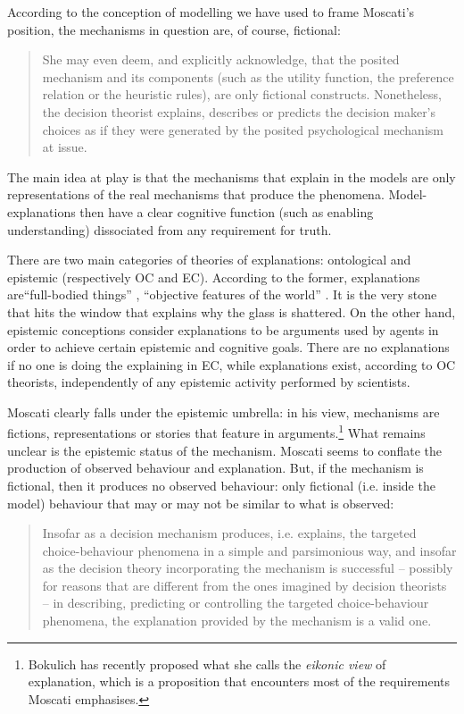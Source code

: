 \documentclass[a4paper,11pt]{article}
\theoremstyle{definition}
\begin{document}
According to the conception of modelling we have used to frame Moscati's position, the mechanisms in question are, of course, fictional:

\begin{quote}
     She may even deem, and explicitly acknowledge, that the posited mechanism and its components (such as the utility function, the preference relation or the heuristic rules), are only fictional constructs. Nonetheless, the decision theorist explains, describes or predicts the decision maker’s choices as if they were generated by the posited psychological mechanism at issue. \citep[p.~2]{Moscati2023}
\end{quote}

The main idea at play is that the mechanisms that explain in the models are only representations of the real mechanisms that produce the phenomena. Model-explanations then have a clear cognitive function (such as enabling understanding) dissociated from any requirement for truth.

There are two main categories of theories of explanations: ontological and epistemic (respectively OC and EC). According to the former, explanations are``full-bodied things'' \citep[p.~40]{Craver2014}, ``objective features of the world'' \citep[p.~27]{Craver2007}. It is the very stone that hits the window that explains why the glass is shattered. On the other hand, epistemic conceptions consider explanations to be arguments used by agents in order to achieve certain epistemic and cognitive goals. There are no explanations if no one is doing the explaining in EC, while explanations exist, according to OC theorists, independently of any epistemic activity performed by scientists.

Moscati clearly falls under the epistemic umbrella: in his view, mechanisms are fictions, representations or stories that feature in arguments.\footnote{Bokulich \citep{Bokulich2018} has recently proposed what she calls the \textit{eikonic view} of explanation, which is a proposition that encounters most of the requirements Moscati emphasises.} What remains unclear is the epistemic status of the mechanism. Moscati seems to conflate the production of observed behaviour and explanation. But, if the mechanism is fictional, then it produces no observed behaviour: only fictional (i.e. inside the model) behaviour that may or may not be similar to what is observed:

\begin{quote}
    Insofar as a decision mechanism produces, i.e. explains, the targeted choice-behaviour phenomena in a simple and parsimonious way, and insofar as the decision theory incorporating the mechanism is successful – possibly for reasons that are different from the ones imagined by decision theorists – in describing, predicting or controlling the targeted choice-behaviour phenomena, the explanation provided by the mechanism is a valid one. \cite[p.~22]{Moscati2023}
\end{quote}
\end{document}
